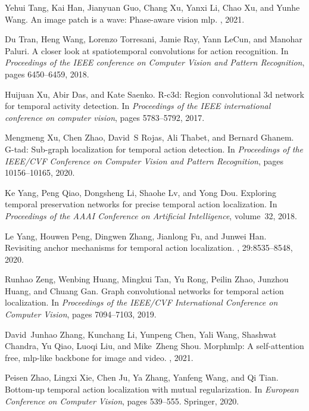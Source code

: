 \documentclass[10pt,twocolumn,letterpaper]{article}
\begin{document}
{\begin{thebibliography}{10}
Yehui Tang, Kai Han, Jianyuan Guo, Chang Xu, Yanxi Li, Chao Xu, and Yunhe Wang.
\newblock An image patch is a wave: Phase-aware vision mlp.
, 2021.

Du Tran, Heng Wang, Lorenzo Torresani, Jamie Ray, Yann LeCun, and Manohar
  Paluri.
\newblock A closer look at spatiotemporal convolutions for action recognition.
\newblock In {\em Proceedings of the IEEE conference on Computer Vision and
  Pattern Recognition}, pages 6450--6459, 2018.

Huijuan Xu, Abir Das, and Kate Saenko.
\newblock R-c3d: Region convolutional 3d network for temporal activity
  detection.
\newblock In {\em Proceedings of the IEEE international conference on computer
  vision}, pages 5783--5792, 2017.

Mengmeng Xu, Chen Zhao, David~S Rojas, Ali Thabet, and Bernard Ghanem.
\newblock G-tad: Sub-graph localization for temporal action detection.
\newblock In {\em Proceedings of the IEEE/CVF Conference on Computer Vision and
  Pattern Recognition}, pages 10156--10165, 2020.

Ke Yang, Peng Qiao, Dongsheng Li, Shaohe Lv, and Yong Dou.
\newblock Exploring temporal preservation networks for precise temporal action
  localization.
\newblock In {\em Proceedings of the AAAI Conference on Artificial
  Intelligence}, volume~32, 2018.

Le Yang, Houwen Peng, Dingwen Zhang, Jianlong Fu, and Junwei Han.
\newblock Revisiting anchor mechanisms for temporal action localization.
, 29:8535--8548, 2020.

Runhao Zeng, Wenbing Huang, Mingkui Tan, Yu Rong, Peilin Zhao, Junzhou Huang,
  and Chuang Gan.
\newblock Graph convolutional networks for temporal action localization.
\newblock In {\em Proceedings of the IEEE/CVF International Conference on
  Computer Vision}, pages 7094--7103, 2019.

David~Junhao Zhang, Kunchang Li, Yunpeng Chen, Yali Wang, Shashwat Chandra, Yu
  Qiao, Luoqi Liu, and Mike~Zheng Shou.
\newblock Morphmlp: {A} self-attention free, mlp-like backbone for image and
  video.
, 2021.

Peisen Zhao, Lingxi Xie, Chen Ju, Ya Zhang, Yanfeng Wang, and Qi Tian.
\newblock Bottom-up temporal action localization with mutual regularization.
\newblock In {\em European Conference on Computer Vision}, pages 539--555.
  Springer, 2020.


\end{thebibliography}}
\end{document}
